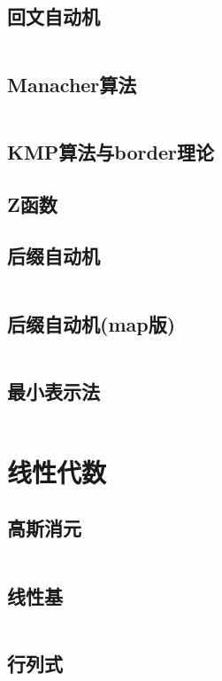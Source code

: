 \documentclass[12pt, a4paper, oneside]{ctexart}
\begin{document}
\begin{multicols}{2}
        \subsection{回文自动机}
        \inputminted{cpp}{src/string/PAM.cpp}
        \subsection{Manacher算法}
        \inputminted{cpp}{src/string/manacher.cpp}
        \subsection{KMP算法与border理论}
        
        \subsection{Z函数}
        
        \subsection{后缀自动机}
        \inputminted{cpp}{src/string/SAM.cpp}
        \subsection{后缀自动机(map版)}
        \inputminted[highlightlines={3,10,15,18}]{cpp}{src/string/SAM_map.cpp}
        \subsection{最小表示法}
        \inputminted{cpp}{src/string/min_pos.cpp}
        \newpage

        \section{线性代数}
        \subsection{高斯消元}
        \inputminted{cpp}{src/linear/gauss.cpp}
        \subsection{线性基}
        \inputminted{cpp}{src/linear/basis.cpp}
        \subsection{行列式}
        

\end{multicols}
\end{document}
